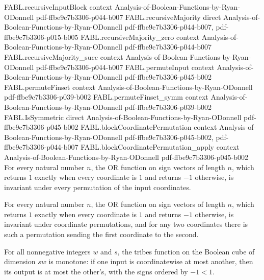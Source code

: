 \begin{theorem}
\proofstep
  {FABL.recursiveInputBlock}
  {context}
  {Analysis-of-Boolean-Functions-by-Ryan-ODonnell}
  {pdf-ffbe9c7b3306-p044-b007}
\proofstep
  {FABL.recursiveMajority}
  {direct}
  {Analysis-of-Boolean-Functions-by-Ryan-ODonnell}
  {pdf-ffbe9c7b3306-p044-b007,
    pdf-ffbe9c7b3306-p015-b005}
\proofstep
  {FABL.recursiveMajority_zero}
  {context}
  {Analysis-of-Boolean-Functions-by-Ryan-ODonnell}
  {pdf-ffbe9c7b3306-p044-b007}
\proofstep
  {FABL.recursiveMajority_succ}
  {context}
  {Analysis-of-Boolean-Functions-by-Ryan-ODonnell}
  {pdf-ffbe9c7b3306-p044-b007}
\proofstep
  {FABL.permuteInput}
  {context}
  {Analysis-of-Boolean-Functions-by-Ryan-ODonnell}
  {pdf-ffbe9c7b3306-p045-b002}
\proofstep
  {FABL.permuteFinset}
  {context}
  {Analysis-of-Boolean-Functions-by-Ryan-ODonnell}
  {pdf-ffbe9c7b3306-p039-b002}
\proofstep
  {FABL.permuteFinset_symm}
  {context}
  {Analysis-of-Boolean-Functions-by-Ryan-ODonnell}
  {pdf-ffbe9c7b3306-p039-b002}
\proofstep
  {FABL.IsSymmetric}
  {direct}
  {Analysis-of-Boolean-Functions-by-Ryan-ODonnell}
  {pdf-ffbe9c7b3306-p045-b002}
\proofstep
  {FABL.blockCoordinatePermutation}
  {context}
  {Analysis-of-Boolean-Functions-by-Ryan-ODonnell}
  {pdf-ffbe9c7b3306-p045-b002,
    pdf-ffbe9c7b3306-p044-b007}
\proofstep
  {FABL.blockCoordinatePermutation_apply}
  {context}
  {Analysis-of-Boolean-Functions-by-Ryan-ODonnell}
  {pdf-ffbe9c7b3306-p045-b002}
For every natural number $n$, the OR function on sign vectors of length $n$, which
returns $1$ exactly when every coordinate is $1$ and returns $-1$ otherwise, is
invariant under every permutation of the input coordinates.
\end{theorem}

\begin{theorem}
\label{FABL.orFunction_transitiveSymmetric}
\leanok
{}
For every natural number $n$, the OR function on sign vectors of length $n$, which
returns $1$ exactly when every coordinate is $1$ and returns $-1$ otherwise, is
invariant under coordinate permutations, and for any two coordinates there is such a
permutation sending the first coordinate to the second.
\end{theorem}

\begin{theorem}
\label{FABL.tribes_monotone}
\leanok
{}
For all nonnegative integers $w$ and $s$, the tribes function on the Boolean cube of
dimension $sw$ is monotone: if one input is coordinatewise at most another, then its
output is at most the other's, with the signs ordered by $-1<1$.
\end{theorem}


